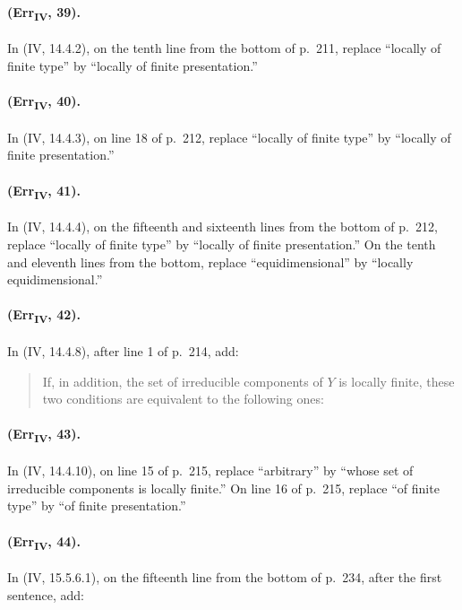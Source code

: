 {\paragraph{(Err\textsubscript{IV}, 39).}
In (IV, 14.4.2), on the tenth line from the bottom of p.~211, replace
``locally of finite type'' by ``locally of finite presentation.''

\paragraph{(Err\textsubscript{IV}, 40).}
In (IV, 14.4.3), on line 18 of p.~212, replace ``locally of finite type''
by ``locally of finite presentation.''

\paragraph{(Err\textsubscript{IV}, 41).}
In (IV, 14.4.4), on the fifteenth and sixteenth lines from the bottom of
p.~212, replace ``locally of finite type'' by ``locally of finite
presentation.''  On the tenth and eleventh lines from the bottom,
replace ``equidimensional'' by ``locally equidimensional.''

\paragraph{(Err\textsubscript{IV}, 42).}
In (IV, 14.4.8), after line 1 of p.~214, add:
\begin{quote}
If, in addition, the set of irreducible components of $Y$ is locally
finite, these two conditions are equivalent to the following ones:
\end{quote}

\paragraph{(Err\textsubscript{IV}, 43).}
In (IV, 14.4.10), on line 15 of p.~215, replace ``arbitrary'' by ``whose
set of irreducible components is locally finite.''  On line 16 of
p.~215, replace ``of finite type'' by ``of finite presentation.''

\paragraph{(Err\textsubscript{IV}, 44).}
In (IV, 15.5.6.1), on the fifteenth line from the bottom of p.~234,
after the first sentence, add:

}
